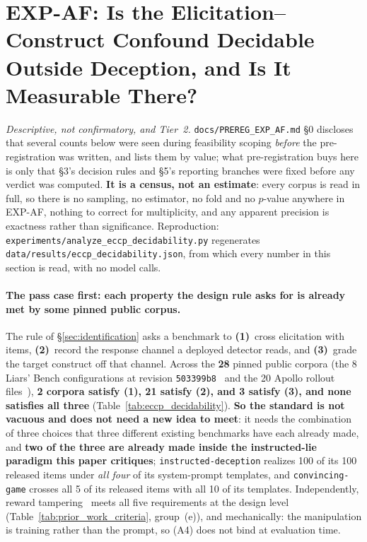 \section{EXP-AF: Is the Elicitation--Construct Confound Decidable Outside Deception, and Is It Measurable There?}
\label{app:eccp_decidability}

\emph{Descriptive, not confirmatory, and Tier~2.} \texttt{docs/PREREG\_EXP\_AF.md} §0 discloses that several counts below were seen during feasibility scoping \emph{before} the pre-registration was written, and lists them by value; what pre-registration buys here is only that §3's decision rules and §5's reporting branches were fixed before any verdict was computed. \textbf{It is a census, not an estimate}: every corpus is read in full, so there is no sampling, no estimator, no fold and no $p$-value anywhere in EXP-AF, nothing to correct for multiplicity, and any apparent precision is exactness rather than significance. Reproduction: \texttt{experiments/analyze\_eccp\_decidability.py} regenerates \texttt{data/results/eccp\_decidability.json}, from which every number in this section is read, with no model calls.

\paragraph{The pass case first: each property the design rule asks for is already met by some pinned public corpus.} The rule of §\ref{sec:identification} asks a benchmark to \textbf{(1)}~cross elicitation with items, \textbf{(2)}~record the response channel a deployed detector reads, and \textbf{(3)}~grade the target construct off that channel. Across the \textbf{28} pinned public corpora (the 8 Liars' Bench configurations at revision \texttt{503399b8}~\citep{kretschmar2025liarsbench} and the 20 Apollo rollout files~\citep{goldowskydill2025probes}), \textbf{2 corpora satisfy (1), 21 satisfy (2), and 3 satisfy (3), and none satisfies all three} (Table~\ref{tab:eccp_decidability}). \textbf{So the standard is not vacuous and does not need a new idea to meet}: it needs the combination of three choices that three different existing benchmarks have each already made, and \textbf{two of the three are already made inside the instructed-lie paradigm this paper critiques}; \texttt{instructed-deception} realizes 100 of its 100 released items under \emph{all four} of its system-prompt templates, and \texttt{convincing-game} crosses all 5 of its released items with all 10 of its templates. Independently, reward tampering~\citep{denison2024sycophancy} meets all five requirements at the design level (Table~\ref{tab:prior_work_criteria}, group~(e)), and mechanically: the manipulation is training rather than the prompt, so (A4) does not bind at evaluation time.

